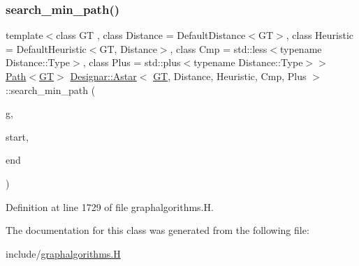 \subsubsection{\texorpdfstring{search\+\_\+min\+\_\+path()}{search\_min\_path()}}
{\footnotesize\ttfamily template$<$class GT , class Distance  = Default\+Distance$<$\+G\+T$>$, class Heuristic  = Default\+Heuristic$<$\+G\+T, Distance$>$, class Cmp  = std\+::less$<$typename Distance\+::\+Type$>$, class Plus  = std\+::plus$<$typename Distance\+::\+Type$>$$>$ \\
\hyperlink{class_designar_1_1_path}{Path}$<$\hyperlink{demo-buildgraph_8_c_a3001c40d2c31ca87ed96cd7d1334a55e}{GT}$>$ \hyperlink{class_designar_1_1_astar}{Designar\+::\+Astar}$<$ \hyperlink{demo-buildgraph_8_c_a3001c40d2c31ca87ed96cd7d1334a55e}{GT}, Distance, Heuristic, Cmp, Plus $>$\+::search\+\_\+min\+\_\+path (\begin{DoxyParamCaption}\item[{\hyperlink{demo-buildgraph_8_c_a3001c40d2c31ca87ed96cd7d1334a55e}{GT} \&}]{g,  }\item[{\hyperlink{class_designar_1_1_astar_a0d4cdf6b94255824c6c93e5ae18e9eb7}{Node} \&}]{start,  }\item[{\hyperlink{class_designar_1_1_astar_a0d4cdf6b94255824c6c93e5ae18e9eb7}{Node} \&}]{end }\end{DoxyParamCaption})\hspace{0.3cm}{\ttfamily [inline]}}



Definition at line 1729 of file graphalgorithms.\+H.



The documentation for this class was generated from the following file\+:\begin{DoxyCompactItemize}
\item 
include/\hyperlink{graphalgorithms_8_h}{graphalgorithms.\+H}\end{DoxyCompactItemize}
